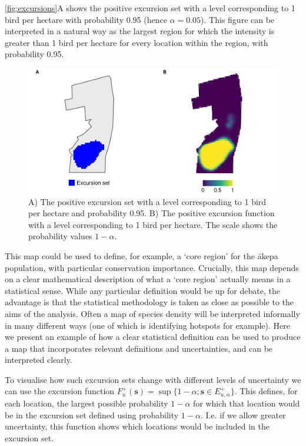 \documentclass{statsoc}
\newcommand{\bs}{\mathbf{s}}
\newcommand{\akepa}{\textquotesingle\={a}kepa}  %
\begin{document}
\autoref{fig:excursions}A shows the positive excursion set with a level corresponding to 1 bird per hectare with probability 0.95 (hence $\alpha = 0.05$).  This figure can be interpreted in a natural way as the largest region for which the intensity is greater than 1 bird per hectare for every location within the region, with probability 0.95. 
\begin{figure}[!htb]
	\includegraphics[scale=0.5]{figures/excursions.png}
	\caption{A) The positive excursion set with a level corresponding to 1 bird per hectare and probability 0.95.  B) The positive excursion function with a level corresponding to 1 bird per hectare.  The scale shows the probability values $1-\alpha$.}
	\label{fig:excursions}
\end{figure} 
This map could be used to define, for example, a `core region' for the \akepa{} population, with particular conservation importance.  Crucially, this map depends on a clear mathematical description of what a `core region' actually means in a statistical sense.  While any particular definition would be up for debate, the advantage is that the statistical methodology is taken as close as possible to the aims of the analysis.  Often a map of species density will be interpreted informally in many different ways (one of which is identifying hotspots for example).  Here we present an example of how a clear statistical definition can be used to produce a map that incorporates relevant definitions and uncertainties, and can be interpreted clearly.  

To visualise how such excursion sets change with different levels of uncertainty we can use the excursion function $F_u^{+}(\bs) = \sup \{1 - \alpha ; \bs \in E_{u,\alpha}^+ \}$.  This defines, for each location, the largest possible probability $1 -\alpha$ for which that location would be in the excursion set defined using probability $1 - \alpha$.  I.e.  if we allow greater uncertainty, this function shows which locations would be included in the excursion set.    
\end{document}
